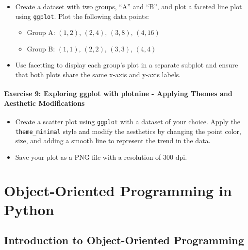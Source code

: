\documentclass[
  letterpaper,
  DIV=11,
  numbers=noendperiod]{scrreprt}
\providecommand{\tightlist}{%
  \setlength{\itemsep}{0pt}\setlength{\parskip}{0pt}}\usepackage{longtable,booktabs,array}
\begin{document}
\begin{itemize}
\item
  Create a dataset with two groups, ``A'' and ``B'', and plot a faceted
  line plot using \texttt{ggplot}. Plot the following data points:

  \begin{itemize}
  \tightlist
  \item
    Group A: \((1, 2)\), \((2, 4)\), \((3, 8)\), \((4, 16)\)
  \item
    Group B: \((1, 1)\), \((2, 2)\), \((3, 3)\), \((4, 4)\)
  \end{itemize}
\item
  Use facetting to display each group's plot in a separate subplot and
  ensure that both plots share the same x-axis and y-axis labels.
\end{itemize}

\hypertarget{exercise-9-exploring-ggplot-with-plotnine---applying-themes-and-aesthetic-modifications}{%
\subsubsection{Exercise 9: Exploring ggplot with plotnine - Applying
Themes and Aesthetic
Modifications}\label{exercise-9-exploring-ggplot-with-plotnine---applying-themes-and-aesthetic-modifications}}

\begin{itemize}
\item
  Create a scatter plot using \texttt{ggplot} with a dataset of your
  choice. Apply the \texttt{theme\_minimal} style and modify the
  aesthetics by changing the point color, size, and adding a smooth line
  to represent the trend in the data.
\item
  Save your plot as a PNG file with a resolution of 300 dpi.
\end{itemize}


\hypertarget{sec-oop}{%
\chapter{Object-Oriented Programming in Python}\label{sec-oop}}

\hypertarget{introduction-to-object-oriented-programming}{%
\section{Introduction to Object-Oriented
Programming}\label{introduction-to-object-oriented-programming}}
\end{document}
